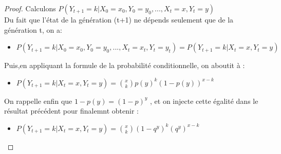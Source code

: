 \begin{proof}
Calculons $P(Y_{t+1} = k | X_0 = x_0, Y_0 = y_0, ..., X_t = x, Y_t = y)$\\
Du fait que l'état de la génération (t+1) ne dépends seulement que de la génération t, on a:
	\begin{itemize}[label=$\bullet$]
	\item $P(Y_{t+1} = k | X_0 = x_0, Y_0 = y_0, ..., X_t = x_t, Y_t = y_t) = P(Y_{t+1} = k | X_t = x, Y_t = y)$
	\end{itemize}
Puis,en appliquant la formule de la probabilité conditionnelle, on aboutit à :
	\begin{itemize}[label=$\bullet$]
	\item  $P(Y_{t+1} = k | X_t = x, Y_t = y)=\binom{x}{k}p(y)^{k} (1-p(y))^{x-k}$
	\end{itemize}
On rappelle enfin que $1-p(y) = (1-p)^{y}$ , et on injecte cette égalité dans le résultat précédent pour finalemnt obtenir :
	\begin{itemize}[label=$\bullet$]
	\item $P(Y_{t+1} = k | X_t = x, Y_t = y)= \binom{x}{k}(1 - q^{y})^{k}(q^{y})^{x - k}$
	\end{itemize}	
\end{proof}






